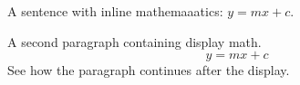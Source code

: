 \documentclass{article}
\begin{document}
A sentence with inline mathemaaatics: $y=mx+c$.

A second paragraph containing display math.
\[
y=mx+c
\]
See how the paragraph continues after the display.
\end{document}
